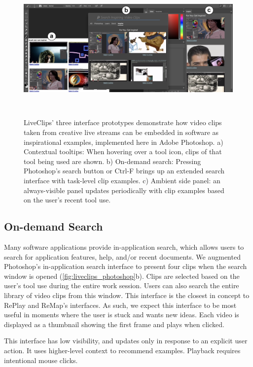 \begin{figure}[b!]
\centering
  \includegraphics[width=\textwidth]{liveclips/figures/all_interfaces.png}
  \caption[LiveClips' three interface prototypes demonstrate how video clips taken from creative live streams can be embedded in software as inspirational examples, implemented here in Adobe Photoshop.]{LiveClips' three interface prototypes demonstrate how video clips taken from creative live streams can be embedded in software as inspirational examples, implemented here in Adobe Photoshop. a) Contextual tooltips: When hovering over a tool icon, clips of that tool being used are shown. b) On-demand search: Pressing Photoshop's search button or Ctrl-F brings up an extended search interface with task-level clip examples. c) Ambient side panel: an always-visible panel updates periodically with clip examples based on the user's recent tool use. }~\label{fig:liveclips_photoshop}
\end{figure}

\subsection{On-demand Search}
Many software applications provide in-application search, which allows users to search for application features, help, and/or recent documents. We augmented Photoshop's in-application search interface to present four clips when the search window is opened (\autoref{fig:liveclips_photoshop}b). Clips are selected based on the user's tool use during the entire work session. Users can also search the entire library of video clips from this window. This interface is the closest in concept to RePlay and ReMap's interfaces. As such, we expect this interface to be most useful in moments where the user is stuck and wants new ideas. Each video is displayed as a thumbnail showing the first frame and plays when clicked.

This interface has low visibility, and updates only in response to an explicit user action. It uses higher-level context to recommend examples. Playback requires intentional mouse clicks.

